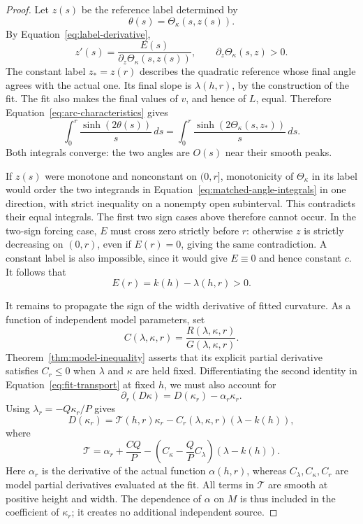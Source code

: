 \begin{proof}
Let $z(s)$ be the reference label determined by
\[
 \theta(s)=\Theta_\kappa(s,z(s)).
\]
By Equation~\eqref{eq:label-derivative},
\[
 z'(s)=\frac{E(s)}{\partial_z\Theta_\kappa(s,z(s))},
 \qquad \partial_z\Theta_\kappa(s,z)>0.
\]
The constant label $z_* = z(r)$ describes the quadratic reference
whose final angle agrees with the actual one.  Its final slope is
$\lambda(h,r)$, by the construction of the fit.  The fit also makes
the final values of $v$, and hence of $L$, equal.  Therefore
Equation~\eqref{eq:arc-characteristics} gives
\begin{equation}\label{eq:matched-angle-integrals}
 \int_0^r\frac{\sinh(2\theta(s))}{s}\,ds
 =\int_0^r\frac{\sinh(2\Theta_\kappa(s,z_*))}{s}\,ds.
\end{equation}
Both integrals converge: the two angles are $O(s)$ near their smooth
peaks.

If $z(s)$ were monotone and nonconstant on $(0,r]$, monotonicity of
$\Theta_\kappa$ in its label would order the two integrands in
Equation~\eqref{eq:matched-angle-integrals} in one direction, with
strict inequality on a nonempty open subinterval.  This contradicts
their equal integrals.  The first two sign cases above therefore
cannot occur.  In the two-sign forcing case, $E$ must cross zero
strictly before $r$: otherwise $z$ is strictly decreasing on $(0,r)$,
even if $E(r)=0$, giving the same contradiction.  A constant label is
also impossible, since it would give $E\equiv0$ and hence constant $c$.
It follows that
\begin{equation}\label{eq:fitted-slope-strict}
 E(r)=k(h)-\lambda(h,r)>0.
\end{equation}

It remains to propagate the sign of the width derivative of fitted
curvature.  As a function of independent model parameters, set
\[
 C(\lambda,\kappa,r)=\frac{R(\lambda,\kappa,r)}
                          {G(\lambda,\kappa,r)}.
\]
Theorem~\ref{thm:model-inequality} asserts that its explicit partial
derivative satisfies $C_r\le0$ when $\lambda$ and $\kappa$ are held
fixed.  Differentiating the second identity in
Equation~\eqref{eq:fit-transport} at fixed $h$, we must also
account for
\[
 \partial_r(D\kappa)=D(\kappa_r)-\alpha_r\kappa_r.
\]
Using $\lambda_r=-Q\kappa_r/P$ gives
\begin{equation}\label{eq:curvature-derivative-transport}
 D(\kappa_r)=\mathcal T(h,r)\kappa_r
                 -C_r(\lambda,\kappa,r)(\lambda-k(h)),
\end{equation}
where
\begin{equation}\label{eq:curvature-derivative-coefficient}
 \mathcal T
  =\alpha_r+\frac{CQ}{P}
     -\left(C_\kappa-\frac{Q}{P}C_\lambda\right)(\lambda-k(h)).
\end{equation}
Here $\alpha_r$ is the derivative of the actual function
$\alpha(h,r)$, whereas $C_\lambda,C_\kappa,C_r$ are model partial
derivatives evaluated at the fit.  All terms in $\mathcal T$ are
smooth at positive height and width.  The dependence of $\alpha$ on
$M$ is thus included in the coefficient of $\kappa_r$; it creates no
additional independent source.


\end{proof}
